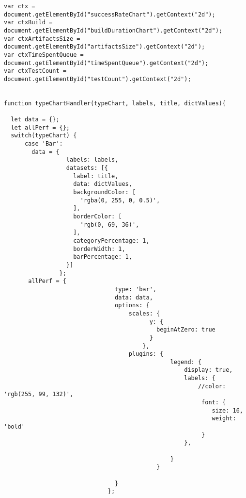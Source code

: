 \begin{lstlisting}






var ctx = document.getElementById("successRateChart").getContext("2d");
var ctxBuild = document.getElementById("buildDurationChart").getContext("2d");
var ctxArtifactsSize = document.getElementById("artifactsSize").getContext("2d");
var ctxTimeSpentQueue = document.getElementById("timeSpentQueue").getContext("2d");
var ctxTestCount = document.getElementById("testCount").getContext("2d");


function typeChartHandler(typeChart, labels, title, dictValues){

  let data = {};
  let allPerf = {};
  switch(typeChart) {
      case 'Bar':
        data = {
                  labels: labels,
                  datasets: [{
                    label: title,
                    data: dictValues,
                    backgroundColor: [
                      'rgba(0, 255, 0, 0.5)',
                    ],
                    borderColor: [
                      'rgb(0, 69, 36)',
                    ],
                    categoryPercentage: 1,
                    borderWidth: 1,
                    barPercentage: 1,
                  }]
                };
       allPerf = {
                                type: 'bar',
                                data: data,
                                options: {
                                    scales: {
                                          y: {
                                            beginAtZero: true
                                          }
                                        },
                                    plugins: {
                                                legend: {
                                                    display: true,
                                                    labels: {
                                                        //color: 'rgb(255, 99, 132)',
                                                         font: {
                                                            size: 16,
                                                            weight: 'bold'
                                                         }
                                                    },

                                                }
                                            }

                                }
                              };


\end{lstlisting}
